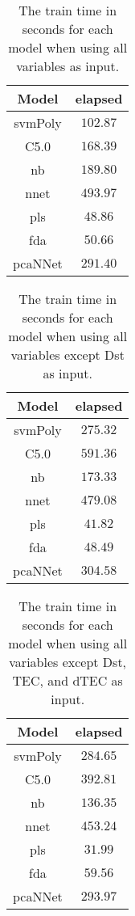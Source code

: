 \begin{table}[!ht]
	\centering
	\begin{tabular}{|c|c|}
		\hline
		Model & elapsed \\ \hline
		svmPoly & $102.87$ \\ \hline
		C5.0 & $168.39$ \\ \hline
		nb & $189.80$ \\ \hline
		nnet & $493.97$ \\ \hline
		pls & $48.86$ \\ \hline
		fda & $50.66$ \\ \hline
		pcaNNet & $291.40$ \\ \hline
	\end{tabular}
	\caption{The train time in seconds for each model when using all variables as input.}
	\label{tab:time:all:train}
\end{table}

\begin{table}[!ht]
	\centering
	\begin{tabular}{|c|c|}
		\hline
		Model & elapsed \\ \hline
		svmPoly & $275.32$ \\ \hline
		C5.0 & $591.36$ \\ \hline
		nb & $173.33$ \\ \hline
		nnet & $479.08$ \\ \hline
		pls & $41.82$ \\ \hline
		fda & $48.49$ \\ \hline
		pcaNNet & $304.58$ \\ \hline
	\end{tabular}
	\caption{The train time in seconds for each model when using all variables except Dst as input.}
	\label{tab:time:noDst:train}
\end{table}

\begin{table}[!ht]
	\centering
	\begin{tabular}{|c|c|}
		\hline
		Model & elapsed \\ \hline
		svmPoly & $284.65$ \\ \hline
		C5.0 & $392.81$ \\ \hline
		nb & $136.35$ \\ \hline
		nnet & $453.24$ \\ \hline
		pls & $31.99$ \\ \hline
		fda & $59.56$ \\ \hline
		pcaNNet & $293.97$ \\ \hline
	\end{tabular}
	\caption{The train time in seconds for each model when using all variables except Dst, TEC, and dTEC as input.}
	\label{tab:time:noTEC:train}
\end{table}

